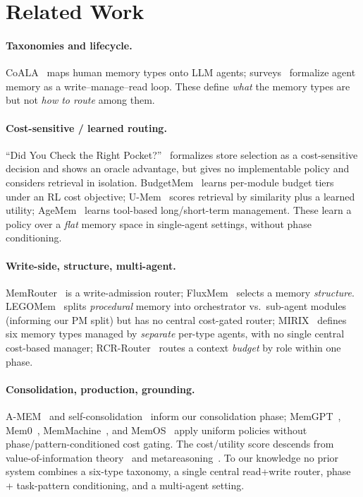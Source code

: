 \documentclass[10pt,twocolumn]{article}
\begin{document}
\section{Related Work}
\paragraph{Taxonomies and lifecycle.} CoALA~\cite{coala} maps human memory types
onto LLM agents; surveys~\cite{survey1,survey2} formalize agent memory as a
write--manage--read loop. These define \emph{what} the memory types are but not
\emph{how to route} among them.

\paragraph{Cost-sensitive / learned routing.} ``Did You Check the Right
Pocket?''~\cite{pocket} formalizes store selection as a cost-sensitive decision
and shows an oracle advantage, but gives no implementable policy and considers
retrieval in isolation. BudgetMem~\cite{budgetmem} learns per-module budget
tiers under an RL cost objective; U-Mem~\cite{umem} scores retrieval by
similarity plus a learned utility; AgeMem~\cite{agemem} learns tool-based
long/short-term management. These learn a policy over a \emph{flat} memory space
in single-agent settings, without phase conditioning.

\paragraph{Write-side, structure, multi-agent.} MemRouter~\cite{memrouter} is a
write-admission router; FluxMem~\cite{fluxmem} selects a memory \emph{structure}.
LEGOMem~\cite{legomem} splits \emph{procedural} memory into orchestrator vs.\
sub-agent modules (informing our PM split) but has no central cost-gated router;
MIRIX~\cite{mirix} defines six memory types managed by \emph{separate} per-type
agents, with no single central cost-based manager; RCR-Router~\cite{rcr} routes a
context \emph{budget} by role within one phase.

\paragraph{Consolidation, production, grounding.} A-MEM~\cite{amem} and
self-consolidation~\cite{selfcons} inform our consolidation phase;
MemGPT~\cite{memgpt}, Mem0~\cite{mem0}, MemMachine~\cite{memmachine}, and
MemOS~\cite{memos} apply uniform policies without phase/pattern-conditioned cost
gating. The cost/utility score descends from value-of-information
theory~\cite{voi} and metareasoning~\cite{meta}. To our knowledge no prior system
combines a six-type taxonomy, a single central read+write router, phase +
task-pattern conditioning, and a multi-agent setting.
\end{document}
